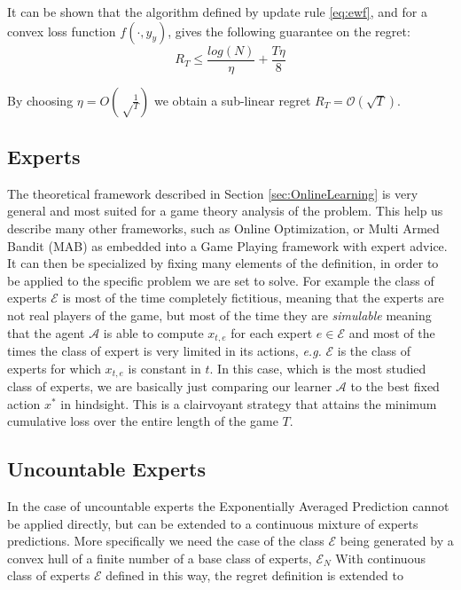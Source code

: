 It can be shown  that the algorithm defined by update rule \eqref{eq:ewf}, and for a convex loss function $f(\cdot,y_y)$, gives the following guarantee on the regret:
$$R_T\le \frac{log(N)}{\eta}+\frac{T\eta}{8}$$

By choosing $\eta=O\left(\sqrt\frac{1}{T}\right)$ we obtain a sub-linear regret $R_T=\mathcal O(\sqrt T)$. %



\subsection{Experts}
The theoretical framework described in Section \ref{sec:OnlineLearning} is very general and most suited for a game theory analysis of the problem. This help us describe many other frameworks, such as Online Optimization, or Multi Armed Bandit (MAB) as embedded into a Game Playing framework with expert advice. It can then be specialized by fixing many elements of the definition, in order to be applied to the specific problem we are set to solve.
For example the class of experts $\mathcal E$ is most of the time completely fictitious, meaning that the experts are not real players of the game, but most of the time they are \emph{simulable} meaning that the agent $\mathcal A$ is able to compute $x_{t,e}$ for each expert $e\in\mathcal E$ and most of the times the class of expert is very limited in its actions, \emph{e.g.} $\mathcal E$ is the class of experts for which $x_{t,e}$ is constant in $t$. In this case, which is the most studied class of experts, we are basically just comparing our learner $\mathcal A$ to the best fixed action $x^*$ in hindsight. This is a clairvoyant strategy that attains the minimum cumulative loss over the entire length of the game $T$.

\subsection{Uncountable Experts}\label{sec:uncountable_exp}

In the case of uncountable experts the Exponentially Averaged Prediction cannot be applied directly, but can be extended to a continuous mixture of experts predictions. More specifically we need the case of the class $\mathcal E$ being generated by a convex hull of a finite number of a base class of experts, $\mathcal E_N$
With continuous class of experts $\mathcal E$ defined in this way, the regret definition is extended to 

